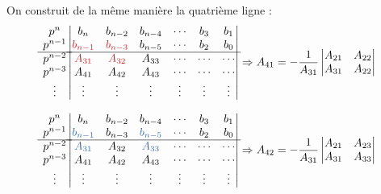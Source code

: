 On construit de la même manière la quatrième ligne :
\[
\begin{matrix}
    p^n    \\
    p^{n-1}\\
    \hline
    p^{n-2}\\
    p^{n-3}\\
    \vdots \\
\end{matrix}
\begin{vmatrix}
    b_n       & b_{n-2}    & b_{n-4}    & \cdots & b_3            & b_1 \\
     \textcolor{col4}{b_{n-1}}   & \textcolor{col4}{b_{n-3}}    & b_{n-5}    
                                & \cdots & b_2            & b_0         \\
    \hline
     \textcolor{col4}{A_{31}}    &  \textcolor{col4}{A_{32}}    & A_{33}    
                                & \cdots & \cdots         & \cdots      \\
    A_{41}   & A_{42}     & A_{43}    & \cdots & \cdots   & \cdots      \\
    \vdots   & \vdots     & \vdots    & \vdots & \vdots   & \vdots      \\
    \end{vmatrix}
\Rightarrow
A_{41}=-\dfrac{1}{A_{31}}
\begin{vmatrix} 
A_{21} & A_{22} \\ A_{31} & A_{22}
\end{vmatrix}
\]

\[
\begin{matrix}
    p^n    \\
    p^{n-1}\\
    \hline
    p^{n-2}\\
    p^{n-3}\\
    \vdots \\
\end{matrix}
\begin{vmatrix}
    b_n       & b_{n-2}    & b_{n-4}    & \cdots & b_3            & b_1  \\
    \textcolor{col1}{b_{n-1}}   &  b_{n-3}    & \textcolor{col1}{b_{n-5}}    
    & \cdots & b_2            & b_0         \\
    \hline
    \textcolor{col1}{A_{31}}     &  A_{32}    & \textcolor{col1}{A_{33}}    
    & \cdots & \cdots         & \cdots      \\
    A_{41}      & A_{42}     & A_{43}    & \cdots & \cdots    & \cdots   \\
    \vdots    & \vdots     & \vdots     & \vdots & \vdots     & \vdots   \\
    \end{vmatrix}
\Rightarrow
A_{42}=-\dfrac{1}{A_{31}}
\begin{vmatrix} 
A_{21} & A_{23} \\ A_{31} & A_{33} 
\end{vmatrix}
\]

